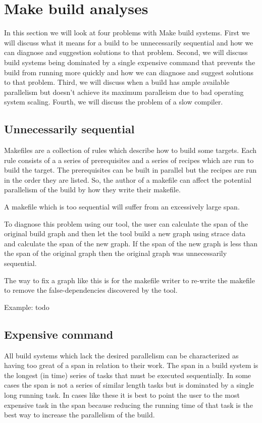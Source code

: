 \documentclass[sigplan,10pt,review,authorversion]{acmart}\settopmatter{printfolios=true,printccs=false,printacmref=false}
\begin{document}
\section{Make build analyses}

In this section we will look at four problems with Make build systems.  First we will discuss
what it means for a build to be unnecessarily sequential and how we can diagnose and suggestion
solutions to that problem.  Second, we will discuss build systems being dominated by a single
expensive command that prevents the build from running more quickly and how we can diagnose and
suggest solutions to that problem.  Third, we will discuss when a build has ample available
parallelism but doesn't achieve its maximum paralleism due to bad operating system scaling.
Fourth, we will discuss the problem of a slow compiler.

\subsection{Unnecessarily sequential}

Makefiles are a collection of rules which describe how to build some targets.  Each rule consists
of a a series of prerequisites and a series of recipes which are run to build the target.  The
prerequisites can be built in parallel but the recipes are run in the order they are listed.  So,
the author of a makefile can affect the potential parallelism of the build by how they write their
makefile.

A makefile which is too sequential will suffer from an excessively large span.

To diagnose this problem using our tool, the user can calculate the span of the original build
graph and then let the tool build a new graph using strace data and calculate the span of the
new graph.  If the span of the new graph is less than the span of the original graph then the
original graph was unnecessarily sequential.

The way to fix a graph like this is for the makefile writer to re-write the makefile to
remove the false-dependencies discovered by the tool.

Example: todo

\subsection{Expensive command}

All build systems which lack the desired parallelism can be characterized as having too great of
a span in relation to their work.  The span in a build system is the longest (in time) series of
tasks that must be executed sequentially.  In some cases the span is not a series of similar length
tasks but is dominated by a single long running task.  In cases like these it is best to point the
user to the most expensive task in the span because reducing the running time of that task is the
best way to increase the parallelism of the build.
\end{document}
